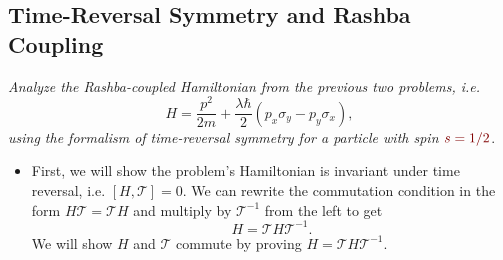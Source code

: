 \documentclass[11pt, a4paper]{article}
\newcommand{\dmath}[1]{\textcolor{Maroon}{#1}}  %
\newcommand{\T}{\mathcal{T}}  %
\begin{document}
	
	
	
\subsection{Time-Reversal Symmetry and Rashba Coupling}
\textit{Analyze the Rashba-coupled Hamiltonian from the previous two problems, i.e.}
\begin{equation*}
	H = \frac{p^{2}}{2m} + \frac{\lambda\hbar}{2} (p_{x}\sigma_{y} - p_{y}\sigma_{x}),
\end{equation*}
\textit{using the formalism of time-reversal symmetry for a particle with spin $ \dmath{s = 1/2} $}.

\begin{itemize}	
	\item First, we will show the problem's Hamiltonian is invariant under time reversal, i.e. $ [H, \T] = 0 $. We can rewrite the commutation condition in the form $ H\T = \T H $ and multiply by $ \T^{-1} $ from the left to get
	\begin{equation*}
		H = \T H \T^{-1}.
	\end{equation*}
	We will show $ H $ and $ \T $ commute by proving $ H = \T H \T^{-1} $.
	

\end{itemize}
\end{document}
